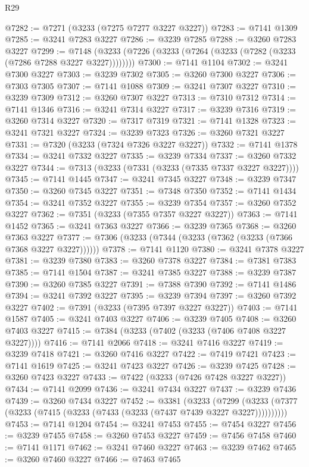 \begin{lexlean}{R29}
\begin{coremodule}
@7282 := @7271 (@3233 (@7275 @7277 @3227 @3227))
@7283 := @7141 @1309
@7285 := @3241 @7283 @3227
@7286 := @3239 @7285
@7288 := @3260 @7283 @3227
@7299 := @7148 (@3233 (@7226 (@3233 (@7264 (@3233 (@7282 (@3233 (@7286 @7288 @3227 @3227))))))))
@7300 := @7141 @1104
@7302 := @3241 @7300 @3227
@7303 := @3239 @7302
@7305 := @3260 @7300 @3227
@7306 := @7303 @7305
@7307 := @7141 @1088
@7309 := @3241 @7307 @3227
@7310 := @3239 @7309
@7312 := @3260 @7307 @3227
@7313 := @7310 @7312
@7314 := @7141 @1346
@7316 := @3241 @7314 @3227
@7317 := @3239 @7316
@7319 := @3260 @7314 @3227
@7320 := @7317 @7319
@7321 := @7141 @1328
@7323 := @3241 @7321 @3227
@7324 := @3239 @7323
@7326 := @3260 @7321 @3227
@7331 := @7320 (@3233 (@7324 @7326 @3227 @3227))
@7332 := @7141 @1378
@7334 := @3241 @7332 @3227
@7335 := @3239 @7334
@7337 := @3260 @7332 @3227
@7344 := @7313 (@3233 (@7331 (@3233 (@7335 @7337 @3227 @3227))))
@7345 := @7141 @1445
@7347 := @3241 @7345 @3227
@7348 := @3239 @7347
@7350 := @3260 @7345 @3227
@7351 := @7348 @7350
@7352 := @7141 @1434
@7354 := @3241 @7352 @3227
@7355 := @3239 @7354
@7357 := @3260 @7352 @3227
@7362 := @7351 (@3233 (@7355 @7357 @3227 @3227))
@7363 := @7141 @1452
@7365 := @3241 @7363 @3227
@7366 := @3239 @7365
@7368 := @3260 @7363 @3227
@7377 := @7306 (@3233 (@7344 (@3233 (@7362 (@3233 (@7366 @7368 @3227 @3227))))))
@7378 := @7141 @1120
@7380 := @3241 @7378 @3227
@7381 := @3239 @7380
@7383 := @3260 @7378 @3227
@7384 := @7381 @7383
@7385 := @7141 @1504
@7387 := @3241 @7385 @3227
@7388 := @3239 @7387
@7390 := @3260 @7385 @3227
@7391 := @7388 @7390
@7392 := @7141 @1486
@7394 := @3241 @7392 @3227
@7395 := @3239 @7394
@7397 := @3260 @7392 @3227
@7402 := @7391 (@3233 (@7395 @7397 @3227 @3227))
@7403 := @7141 @1587
@7405 := @3241 @7403 @3227
@7406 := @3239 @7405
@7408 := @3260 @7403 @3227
@7415 := @7384 (@3233 (@7402 (@3233 (@7406 @7408 @3227 @3227))))
@7416 := @7141 @2066
@7418 := @3241 @7416 @3227
@7419 := @3239 @7418
@7421 := @3260 @7416 @3227
@7422 := @7419 @7421
@7423 := @7141 @1619
@7425 := @3241 @7423 @3227
@7426 := @3239 @7425
@7428 := @3260 @7423 @3227
@7433 := @7422 (@3233 (@7426 @7428 @3227 @3227))
@7434 := @7141 @2099
@7436 := @3241 @7434 @3227
@7437 := @3239 @7436
@7439 := @3260 @7434 @3227
@7452 := @3381
    (@3233
      (@7299 (@3233 (@7377 (@3233 (@7415 (@3233 (@7433 (@3233 (@7437 @7439 @3227 @3227))))))))))
@7453 := @7141 @1204
@7454 := @3241 @7453
@7455 := @7454 @3227
@7456 := @3239 @7455
@7458 := @3260 @7453 @3227
@7459 := @7456 @7458
@7460 := @7141 @1171
@7462 := @3241 @7460 @3227
@7463 := @3239 @7462
@7465 := @3260 @7460 @3227
@7466 := @7463 @7465

\end{coremodule}
\end{lexlean}
